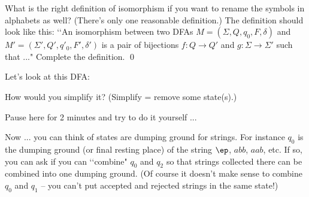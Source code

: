\newpage
\begin{ex}
  What is the right definition of isomorphism
  if you want to rename the symbols in alphabets as well?
  (There's only one reasonable definition.)
  The definition should look like this:
  \lq\lq An isomorphism between two DFAs
  $M = (\Sigma, Q, q_0, F, \delta)$
  and
  $M' = (\Sigma', Q', q'_0, F', \delta')$
  is a pair of bijections $f: Q \rightarrow Q'$ and
  $g: \Sigma \rightarrow \Sigma'$ such that ..."
  Complete the definition.
  \qed
\end{ex}


\newpage

Let's look at this DFA:

\begin{comment}

from latextool_basic import *
print(automata(layout="""
A  B

C  D
""",
edges="A,$a$,B|A,$b$,C|B,$a$,D|B,$b$,C|C,$b$,A|C,$a$,D|D,$a$,B|D,$b$,A",
A='initial|label=$q_0$',
B='accept|label=$q_1$',
C='label=$q_2$',
D='accept|label=$q_3$', xscale=1.3,
))
\end{python}
\end{comment}
\begin{center}
\end{center}

How would you simplify it? (Simplify = remove some state(s).)

Pause here for 2 minutes and try to do it yourself ...

Now ... you can think of states are dumping ground for
strings.
For instance $q_0$ is the dumping ground (or final resting place)
of the string $\ep$, $abb$, $aab$, etc.
If so, you can ask if you can \lq\lq combine" $q_0$ and $q_2$
so that strings collected there can be combined into one
dumping ground.
(Of course it doesn't make sense to combine $q_0$ and $q_1$ -- you can't put accepted and rejected strings in the same state!)

